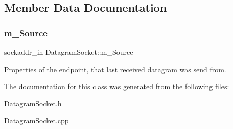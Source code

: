 \subsection{Member Data Documentation}
\mbox{\label{classDatagramSocket_a1b7784d4356ad11fdb109c44c5b227ab}} 
\subsubsection{\texorpdfstring{m\+\_\+\+Source}{m\_Source}}
{\footnotesize\ttfamily sockaddr\+\_\+in Datagram\+Socket\+::m\+\_\+\+Source\hspace{0.3cm}{\ttfamily [protected]}}



Properties of the endpoint, that last received datagram was send from. 



The documentation for this class was generated from the following files\+:\begin{DoxyCompactItemize}
\item 
\hyperlink{DatagramSocket_8h}{Datagram\+Socket.\+h}\item 
\hyperlink{DatagramSocket_8cpp}{Datagram\+Socket.\+cpp}\end{DoxyCompactItemize}
